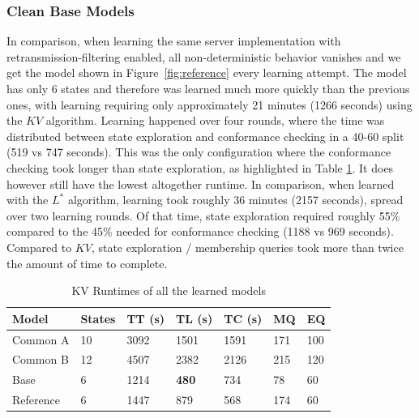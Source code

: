 \subsubsection*{Clean Base Models}

In comparison, when learning the same server implementation with retransmission-filtering enabled, all non-deterministic behavior vanishes and we get the model shown in Figure~\ref{fig:reference} every learning attempt. The model has only 6 states and therefore was learned much more quickly than the previous ones, with learning requiring only approximately 21 minutes (1266 seconds) using the $KV$ algorithm. Learning happened over four rounds, where the time was distributed between state exploration and conformance checking in a 40-60 split (519 vs 747 seconds). This was the only configuration where the conformance checking took longer than state exploration, as highlighted in Table \ref{tab:runtime_summary_kv}. It does however still have the lowest altogether runtime. In comparison, when learned with the $L^*$ algorithm, learning took roughly 36 minutes (2157 seconds), spread over two learning rounds. Of that time, state exploration required roughly 55\% compared to the 45\% needed for conformance checking (1188 vs 969 seconds). Compared to $KV$, state exploration / membership queries took more than twice the amount of time to complete.

\begin{table}[h]
	\centering
	\begin{tabular}{|l|l|l|l|l|l|l|}
		\hline
		\rowcolor[HTML]{C0C0C0} 
		Model     & States & TT (s)  & TL (s)  & TC (s)  & MQ  & EQ  \\ \hline
		Common A  & 10     & 3092 & 1501 & 1591 & 171 & 100 \\ \hline
		Common B  & 12     & 4507 & 2382 & 2126 & 215 & 120 \\ \hline
		Base      & 6      & 1214 & \textbf{480}  & 734  & 78  & 60  \\ \hline
		Reference & 6      & 1447 & 879  & 568  & 174 & 60  \\ \hline
	\end{tabular}
	\caption{KV Runtimes of all the learned models}
	\label{tab:runtime_summary_kv}
\end{table}

